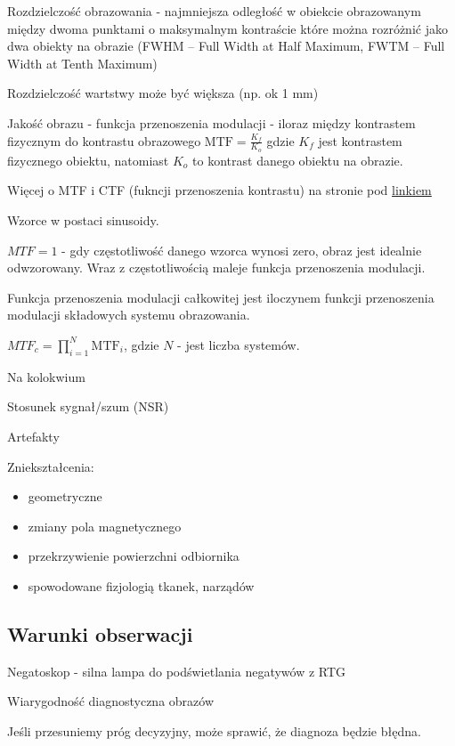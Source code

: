 \documentclass{article}
\begin{document}
Rozdzielczość obrazowania - najmniejsza odległość w obiekcie obrazowanym między dwoma punktami o maksymalnym kontraście które można rozróżnić jako dwa obiekty na obrazie (FWHM – Full Width at Half Maximum, FWTM – Full Width at Tenth Maximum)

Rozdzielczość wartstwy może być większa (np. ok 1 mm)

Jakość obrazu - funkcja przenoszenia modulacji - iloraz między kontrastem fizycznym do kontrastu obrazowego $\mathrm{MTF} = \frac{K_f}{K_o}$ gdzie $K_f$ jest kontrastem fizycznego obiektu, natomiast $K_o$ to kontrast danego obiektu na obrazie.

Więcej o MTF i CTF (fukncji przenoszenia kontrastu) na stronie pod \href{https://brain.fuw.edu.pl/edu/index.php/Obrazowanie:Obrazowanie_Medyczne/Podstawowe_Parametry_Obraz%C3%B3w#label-fig:modulation_depth}{linkiem}

Wzorce w postaci sinusoidy.

$MTF = 1$ - gdy częstotliwość danego wzorca wynosi zero, obraz jest idealnie odwzorowany. Wraz z częstotliwością maleje funkcja przenoszenia modulacji.

Funkcja przenoszenia modulacji całkowitej jest iloczynem funkcji przenoszenia modulacji składowych systemu obrazowania.

$MTF_c = \displaystyle\prod_{i=1}^{N}\mathrm{MTF}_i$, gdzie $N$ - jest liczba systemów.

Na kolokwium

Stosunek sygnał/szum (NSR)

Artefakty

Zniekształcenia:
\begin{itemize}
    \item geometryczne
    \item zmiany pola magnetycznego
    \item przekrzywienie powierzchni odbiornika
    \item spowodowane fizjologią tkanek, narządów
\end{itemize}

\subsection{Warunki obserwacji}

Negatoskop - silna lampa do podświetlania negatywów z RTG

Wiarygodność diagnostyczna obrazów

Jeśli przesuniemy próg decyzyjny, może sprawić, że diagnoza będzie błędna.
\end{document}
